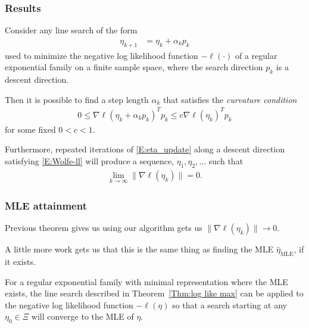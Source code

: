 \documentclass[slidestop,compress, 10pt]{beamer}
\newcommand{\etaMLE}{\hat{\eta}_{\textrm{MLE}}}
\begin{document}
\frame
{
\frametitle{Results}
{\small
\begin{theorem} \label{Thm:log like max}
Consider any line search of the form 
\begin{align}
	\eta_{k+1} &= \eta_k + \alpha_k p_k \label{E:eta_update}
\end{align}
used to minimize the negative log likelihood function $-\ell(\cdot)$ of a regular 
exponential family on a finite sample space, where the search direction $p_k$ 
is a descent direction.

Then it is possible to find a step length $\alpha_k$ 
that satisfies the \emph{curvature condition}
\begin{align}
	0 \leq \nabla \ell( \eta_k + \alpha_k p_k)^T p_k  \leq c \nabla \ell(\eta_k)^T p_k  
\label{E:Wolfe-ll}
\end{align}
for some fixed $0 < c < 1$.

Furthermore, repeated iterations of \eqref{E:eta_update} along a descent direction 
satisfying \eqref{E:Wolfe-ll} will produce a sequence, $\eta_1, \eta_2, \ldots$ such 
that
\begin{align*}
	\lim_{k \to \infty} \lVert \nabla \ell(\eta_k) \rVert = 0.
\end{align*}
\end{theorem}
}
}

\frame
{
\frametitle{MLE attainment}
Previous theorem gives us using our algorithm gets us 
$\lVert \nabla \ell(\eta_k) \rVert \to 0$.  

A little more work gets us that 
this is the same thing as finding the MLE $\etaMLE$, if it exists.

\begin{theorem} \label{Thm:Line Search works}
For a regular exponential family with minimal representation where the MLE exists, the 
line search described in 
Theorem~\ref{Thm:log like max} can be applied to the negative log likelihood function 
$-\ell(\eta)$ so that a search 
starting at any $\eta_0 \in \Xi$ will converge to the MLE of $\eta$.
\end{theorem}

}
\end{document}
